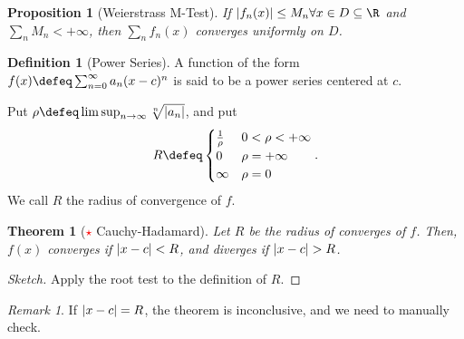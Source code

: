 \documentclass[12pt, oneside]{article}
\newcommand*{\important}{\textcolor{red}{$\star$} }
\theoremstyle{definition}
\newtheorem{defn}{Definition}
\theoremstyle{plain}
\newtheorem{thm}{Theorem}
\newtheorem{prop}{Proposition}
\theoremstyle{remark}
\newtheorem{remark}{Remark}
\begin{document}
\begin{prop}[Weierstrass M-Test]
  If $\abs{f_n(x)} \leq M_n \forall x \in D \subseteq \R$ and $\sum_n M_n < + \infty$, then $\sum_n f_n(x)$ converges uniformly on $D$.
\end{prop}


\begin{defn}[Power Series]
  A function of the form $f(x) \defeq \sum_{n=0}^\infty a_n (x-c)^n$ is said to be a power series centered at $c$.

  Put $\rho \defeq \limsup_{n \to \infty} \sqrt[n]{\abs{a_n}}$, and put \[
  R \defeq \begin{cases}
    \frac{1}{\rho} & 0 < \rho < + \infty\\
    0 & \rho = +\infty\\
    \infty & \rho = 0
  \end{cases}.
  \]
  We call $R$ the radius of convergence of $f$.
\end{defn}

\begin{thm}[\important Cauchy-Hadamard]
  Let $R$ be the radius of converges of $f$. Then, $f(x)$ converges if $\abs{x - c} < R$, and diverges if $\abs{x -c} > R$.
\end{thm}
\begin{proof}[Sketch]
  Apply the root test to the definition of $R$.
\end{proof}

\begin{remark}
  If $\abs{x - c} = R$, the theorem is inconclusive, and we need to manually check.
\end{remark}
\end{document}
